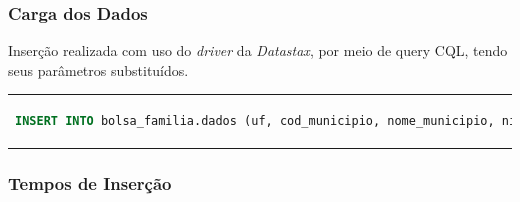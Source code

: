 \documentclass[brazil]{beamer}
\begin{document}
\begin{frame}[fragile]
	\frametitle{Carga dos Dados}
	Inserção realizada com uso do \emph{driver} da \emph{Datastax}, por meio de query CQL, tendo seus parâmetros substituídos.
	
	\begin{tabular}{c}
		\begin{lstlisting}[caption={Código CQL para inserção},language=SQL]
			INSERT INTO bolsa_familia.dados (uf, cod_municipio, nome_municipio, nis_favorecido, nome_favorecido, fonte, valor, periodo) VALUES (?, ?, ?, ?, ?, ?, ?, ?)
		\end{lstlisting}
	\end{tabular}
\end{frame}

\begin{frame}
	\frametitle{Tempos de Inserção}
	
		\begin{table}
		\centering
		\caption{Tempos de Inserção}
		\end{table}	
	
		\begin{table}
			\centering
			\caption{Comparativo}
		\end{table}	
	
\end{frame}
\end{document}
